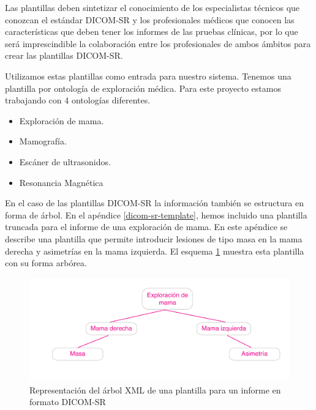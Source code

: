 Las plantillas deben sintetizar el conocimiento de los especialistas técnicos que conozcan el estándar DICOM-SR y los profesionales médicos que conocen las características que deben tener los informes de las pruebas clínicas, por lo que será imprescindible la colaboración entre los profesionales de ambos ámbitos para crear las plantillas DICOM-SR.\medskip\par

Utilizamos estas plantillas como entrada para nuestro sistema. Tenemos una plantilla por ontología de exploración médica. Para este proyecto estamos trabajando con 4 ontologías diferentes.
\begin{itemize}
	\item Exploración de mama.
	\item Mamografía.
	\item Escáner de ultrasonidos.
	\item Resonancia Magnética
\end{itemize}

En el caso de las plantillas DICOM-SR la información también se estructura en forma de árbol. En el apéndice \ref{dicom-sr-template}, hemos incluido una plantilla truncada para el informe de una exploración de mama. En este apéndice se describe una plantilla que permite introducir lesiones de tipo masa en la mama derecha y asimetrías en la mama izquierda. El esquema \ref{fig:dicom-template} muestra esta plantilla con su  forma arbórea.\medskip\par

\begin{figure}[ht]
\centering
\includegraphics[scale=0.7]{./imgs/esquemas/dicomTreeTemplate.pdf}
\caption{Representación del árbol XML de una plantilla para un informe en formato DICOM-SR}
\label{fig:dicom-template}
\end{figure}


